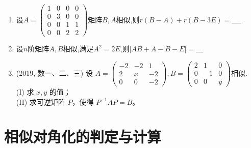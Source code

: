 \documentclass[12pt, a4paper, oneside, UTF8]{ctexbook}
\begin{document}
\begin{enumerate}
    \item 设$A=\begin{pmatrix}
        1 & 0 & 0 & 0 \\
        0 & 3 & 0 & 0 \\
        0 & 0 & 1 & 1 \\
        0 & 0 & 2 & 2
    \end{pmatrix}$矩阵$B,A$相似,则$r(B-A)+r(B-3E)=\_\_\_\_$
    
    \begin{solution}
        \newpage
    \end{solution}

    \item 设$n$阶矩阵$A,B$相似,满足$A^2=2E$,则$\left|AB+A-B-E\right|=\_\_\_$
    
    \begin{solution}
        \newpage
    \end{solution}

    \item (2019, 数一、二、三) 设
    $
    A = \begin{pmatrix}
    -2 & -2 & 1 \\
    2 & x & -2 \\
    0 & 0 & -2
    \end{pmatrix},
    B = \begin{pmatrix}
    2 & 1 & 0 \\
    0 & -1 & 0 \\
    0 & 0 & y
    \end{pmatrix}
    $相似.\\
    (I) 求 $x, y$ 的值； \\
    (II) 求可逆矩阵 $P$，使得 $P^{-1}AP = B$。
    
    \begin{solution}
    \newpage
    \end{solution}
\end{enumerate}

\section{相似对角化的判定与计算}
\end{document}
